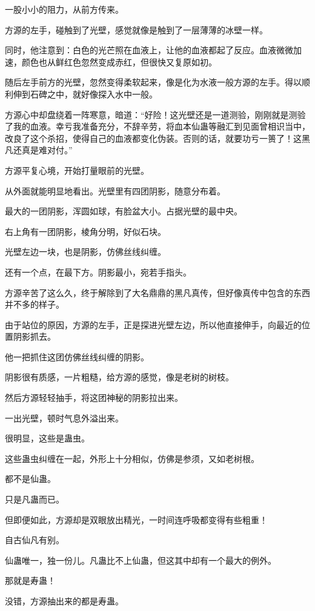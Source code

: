 \begin{this_body}
一股小小的阻力，从前方传来。

方源的左手，碰触到了光壁，感觉就像是触到了一层薄薄的冰壁一样。

同时，他注意到：白色的光芒照在血液上，让他的血液都起了反应。血液微微加速，颜色也从鲜红色忽然变成赤红，但很快又复原如初。

随后左手前方的光壁，忽然变得柔软起来，像是化为水液一般方源的左手。得以顺利伸到石碑之中，就好像探入水中一般。

方源心中却盘绕着一阵寒意，暗道：“好险！这光壁还是一道测验，刚刚就是测验了我的血液。幸亏我准备充分，不辞辛劳，将血本仙蛊等融汇到见面曾相识当中，改良了这个杀招，使得自己的血液都变化伪装。否则的话，就要功亏一篑了！这黑凡还真是难对付。”

方源平复心境，开始打量眼前的光壁。

从外面就能明显地看出。光壁里有四团阴影，随意分布着。

最大的一团阴影，浑圆如球，有脸盆大小。占据光壁的最中央。

右上角有一团阴影，棱角分明，好似石块。

光壁左边一块，也是阴影，仿佛丝线纠缠。

还有一个点，在最下方。阴影最小，宛若手指头。

方源辛苦了这么久，终于解除到了大名鼎鼎的黑凡真传，但好像真传中包含的东西并不多的样子。

由于站位的原因，方源的左手，正是探进光壁左边，所以他直接伸手，向最近的位置阴影抓去。

他一把抓住这团仿佛丝线纠缠的阴影。

阴影很有质感，一片粗糙，给方源的感觉，像是老树的树枝。

然后方源轻轻抽手，将这团神秘的阴影拉出来。

一出光壁，顿时气息外溢出来。

很明显，这些是蛊虫。

这些蛊虫纠缠在一起，外形上十分相似，仿佛是参须，又如老树根。

都不是仙蛊。

只是凡蛊而已。

但即便如此，方源却是双眼放出精光，一时间连呼吸都变得有些粗重！

自古仙凡有别。

仙蛊唯一，独一份儿。凡蛊比不上仙蛊，但这其中却有一个最大的例外。

那就是寿蛊！

没错，方源抽出来的都是寿蛊。


\end{this_body}
